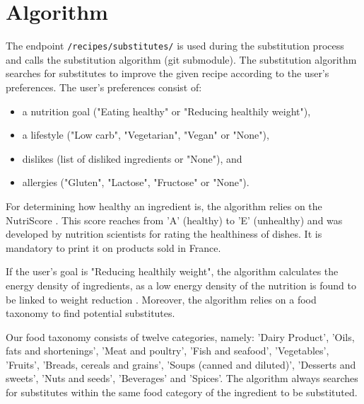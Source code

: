 \section{Algorithm} \label{algorithm}
The endpoint \texttt{/recipes/substitutes/} is used during the substitution process and calls the substitution algorithm (git submodule). The substitution algorithm searches for substitutes to improve the given recipe according to the user's preferences. The user's preferences consist of:
\vspace{-1em}
\begin{itemize}
	\itemsep-0.5em 
	\item a nutrition goal ("Eating healthy" or "Reducing healthily weight"),
	\item a lifestyle ("Low carb", "Vegetarian", "Vegan" or "None"),
	\item dislikes (list of disliked ingredients or "None"), and
	\item allergies ("Gluten", "Lactose", "Fructose" or "None").
\end{itemize} 
\vspace{1em}

For determining how healthy an ingredient is, the algorithm relies on the NutriScore \autocite{julia_nutri-score_2017}. This score reaches from 'A' (healthy) to 'E' (unhealthy) and was developed by nutrition scientists for rating the healthiness of dishes. It is mandatory to print it on products sold in France. 

If the user's goal is "Reducing healthily weight", the algorithm calculates the energy density of ingredients, as a low energy density of the nutrition is found to be linked to weight reduction \autocite{ello-martin_influence_2005}. Moreover, the algorithm relies on a food taxonomy to find potential substitutes. 

Our food taxonomy consists of twelve categories, namely: 'Dairy Product',  'Oils, fats and shortenings', 'Meat and poultry',    'Fish and seafood', 'Vegetables', 'Fruits', 'Breads, cereals and grains', 'Soups (canned and diluted)', 'Desserts and sweets', 'Nuts and seeds', 'Beverages' and 'Spices'. The algorithm always searches for substitutes within the same food category of the ingredient to be substituted.
\clearpage

